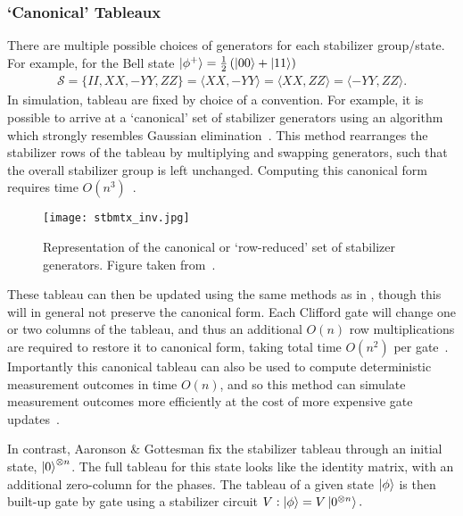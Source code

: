 \subsubsection*{`Canonical' Tableaux}
There are multiple possible choices of generators for each stabilizer group/state. For example, for the Bell state $\ket{\phi^{+}}=\frac{1}{2}\left(\ket{00}+\ket{11}\right)$
\begin{align}
    \mathcal{S} = \{II, XX, -YY, ZZ\} = \langle XX,-YY\rangle = \langle XX, ZZ\rangle = \langle -YY,ZZ\rangle.
\end{align}
In simulation, tableau are fixed by choice of a convention. For example, it is possible to arrive at a `canonical' set of stabilizer generators using an algorithm which strongly resembles Gaussian elimination~\cite{Garcia2012}. This method rearranges the stabilizer rows of the tableau by multiplying and swapping generators, such that the overall stabilizer group is left unchanged. Computing this canonical form requires  time $O(n^{3})$~\cite{Garcia2012}.
\begin{figure}[b]
    \centering
    \texttt{[image: stbmtx\_inv.jpg]}
    \caption{Representation of the canonical or `row-reduced' set of stabilizer generators. Figure taken from~\cite{Garcia2012}.}
\label{fig:canoncialtableau}
\end{figure}
These tableau can then be updated using the same methods as in \cite{Aaronson2004}, though this will in general not preserve the canonical form. Each Clifford gate will change one or two columns of the tableau, and thus an additional $O(n)$ row multiplications are required to restore it to canonical form, taking total time $O(n^{2})$ per gate~\cite{Garcia2015}.
Importantly this canonical tableau can also be used to compute deterministic measurement outcomes in time $O(n)$, and so this method can simulate measurement outcomes more efficiently at the cost of more expensive gate updates~\cite{Garcia2015}.\par
In contrast, Aaronson \& Gottesman fix the stabilizer tableau through an initial state, $\ket{0}^{\otimes n}$. The full tableau for this state looks like the identity matrix, with an additional zero-column for the phases. The tableau of a given state $\ket{\phi}$ is then built-up gate by gate using a stabilizer circuit $V:\ket{\phi}=V\ket{0^{\otimes n}}.$
